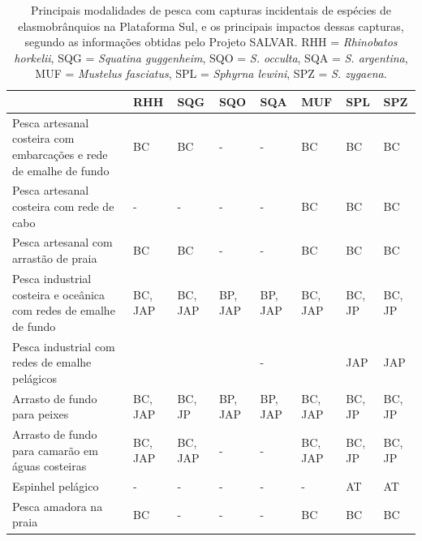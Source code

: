 \documentclass[a4paper,11pt,twoside,showtrims,onecolumn,openright,final]{memoir}
\begin{document}
\begin{table}
\caption{Principais modalidades de pesca com capturas incidentais de espécies de
	 elasmobrânquios na Plataforma Sul, e os principais impactos dessas capturas,
	 segundo as informações obtidas pelo Projeto SALVAR.
         RHH = \emph{Rhinobatos horkelii}, SQG = \emph{Squatina guggenheim}, 
         SQO = \emph{S. occulta}, SQA = \emph{S. argentina},
         MUF = \emph{Mustelus fasciatus}, SPL = \emph{Sphyrna lewini},
         SPZ = \emph{S. zygaena}.}
\label{tab:quadro-pescaXespecies}
\begin{tiny}
\begin{tabularx}{\textwidth}{XXXXXXXX}
\toprule
			& RHH			& SQG			& SQO			&	SQA		& MUF			& SPL		 & SPZ		 \\
\midrule
\addlinespace
Pesca artesanal 
costeira com 
embarcações e 
rede de emalhe 
de fundo 		& BC			& BC			&	-		&	-		& BC			& BC		& BC			\\
\midrule
\addlinespace
Pesca artesanal 
costeira com 
rede de cabo		& -			& -			& -			&	-		& BC			& BC		& BC			\\
\midrule
\addlinespace
Pesca artesanal com 
arrastão de praia	& BC			& BC			& -			&	-		& BC			& BC		& BC			\\
\midrule
\addlinespace
Pesca industrial 
costeira e oceânica
com redes de 
emalhe de fundo 	& BC, JAP		& BC, JAP		& BP, JAP		&	BP, JAP		& BC, JAP		& BC, JP	& BC, JP		\\
\midrule
\addlinespace
Pesca industrial 
com redes de emalhe 
pelágicos		& 			&			&			&	-		&			& JAP		& JAP			\\
\midrule
\addlinespace
Arrasto de fundo 
para peixes		& BC, JAP		& BC, JP		& BP, JAP		&	BP, JAP		& BC, JAP		& BC, JP	& BC, JP		\\
\midrule
\addlinespace
Arrasto de fundo 
para camarão em 
águas costeiras		& BC, JAP		& BC, JAP		& -			&	-		& BC, JAP		& BC, JP	& BC, JP		\\
\midrule
\addlinespace
Espinhel pelágico 	& -			& -			& -			&	-		& -			& AT		& AT			\\
\midrule
\addlinespace
Pesca amadora na 
praia 			& BC			& -			& -			&	-		& BC			& BC		& BC			\\
\bottomrule
\end{tabularx}
\end{tiny}
\end{table}
\end{document}
